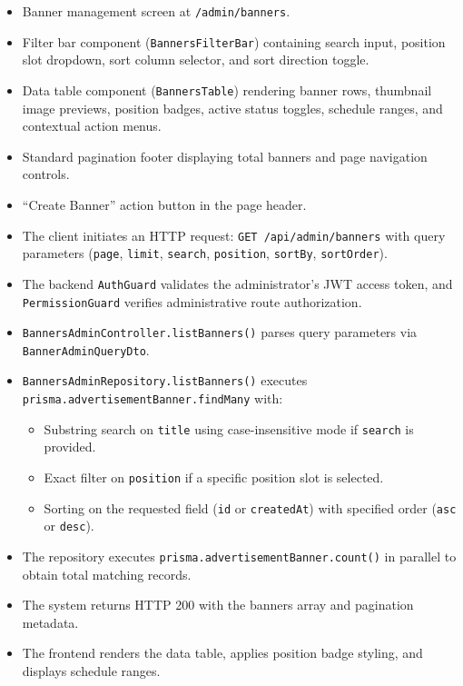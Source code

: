 \begin{itemize}[leftmargin=1.6em,topsep=3pt,itemsep=2pt,parsep=0pt,label=$\bullet$]
    \item Banner management screen at \texttt{/admin/banners}.
    \item Filter bar component (\texttt{BannersFilterBar}) containing search input, position slot dropdown, sort column selector, and sort direction toggle.
    \item Data table component (\texttt{BannersTable}) rendering banner rows, thumbnail image previews, position badges, active status toggles, schedule ranges, and contextual action menus.
    \item Standard pagination footer displaying total banners and page navigation controls.
    \item ``Create Banner'' action button in the page header.
\end{itemize}

\begin{itemize}[leftmargin=1.6em,topsep=3pt,itemsep=2pt,parsep=0pt,label=$\bullet$]
    \item The client initiates an HTTP request: \texttt{GET /api/admin/banners} with query parameters (\texttt{page}, \texttt{limit}, \texttt{search}, \texttt{position}, \texttt{sortBy}, \texttt{sortOrder}).
    \item The backend \texttt{AuthGuard} validates the administrator's JWT access token, and \texttt{PermissionGuard} verifies administrative route authorization.
    \item \texttt{Banners\allowbreak{}Admin\allowbreak{}Controller.\allowbreak{}listBanners()} parses query parameters via \texttt{Banner\allowbreak{}Admin\allowbreak{}Query\allowbreak{}Dto}.
    \item \texttt{Banners\allowbreak{}Admin\allowbreak{}Repository.\allowbreak{}listBanners()} executes \texttt{prisma.\allowbreak{}advertisement\allowbreak{}Banner.\allowbreak{}findMany} with:
        \begin{itemize}[leftmargin=1.6em,topsep=2pt,itemsep=2pt,parsep=0pt]
            \item Substring search on \texttt{title} using case-insensitive mode if \texttt{search} is provided.
            \item Exact filter on \texttt{position} if a specific position slot is selected.
            \item Sorting on the requested field (\texttt{id} or \texttt{createdAt}) with specified order (\texttt{asc} or \texttt{desc}).
        \end{itemize}
    \item The repository executes \texttt{prisma.advertisementBanner.count()} in parallel to obtain total matching records.
    \item The system returns HTTP 200 with the banners array and pagination metadata.
    \item The frontend renders the data table, applies position badge styling, and displays schedule ranges.
\end{itemize}

